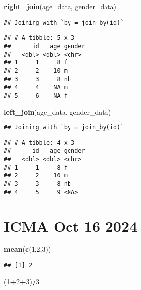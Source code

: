\documentclass[
]{article}
\newenvironment{Shaded}{\begin{snugshade}}{\end{snugshade}}
\newcommand{\DecValTok}[1]{\textcolor[rgb]{0.00,0.00,0.81}{#1}}
\newcommand{\FunctionTok}[1]{\textcolor[rgb]{0.13,0.29,0.53}{\textbf{#1}}}
\newcommand{\NormalTok}[1]{#1}
\newcommand{\SpecialCharTok}[1]{\textcolor[rgb]{0.81,0.36,0.00}{\textbf{#1}}}
\begin{document}
\begin{Shaded}
\begin{Highlighting}[]
\FunctionTok{right\_join}\NormalTok{(age\_data, gender\_data)}
\end{Highlighting}
\end{Shaded}

\begin{verbatim}
## Joining with `by = join_by(id)`
\end{verbatim}

\begin{verbatim}
## # A tibble: 5 x 3
##      id   age gender
##   <dbl> <dbl> <chr> 
## 1     1     8 f     
## 2     2    10 m     
## 3     3     8 nb    
## 4     4    NA m     
## 5     6    NA f
\end{verbatim}

\begin{Shaded}
\begin{Highlighting}[]
\FunctionTok{left\_join}\NormalTok{(age\_data, gender\_data)}
\end{Highlighting}
\end{Shaded}

\begin{verbatim}
## Joining with `by = join_by(id)`
\end{verbatim}

\begin{verbatim}
## # A tibble: 4 x 3
##      id   age gender
##   <dbl> <dbl> <chr> 
## 1     1     8 f     
## 2     2    10 m     
## 3     3     8 nb    
## 4     5     9 <NA>
\end{verbatim}

\section{ICMA Oct 16 2024}\label{icma-oct-16-2024}

\begin{Shaded}
\begin{Highlighting}[]
\FunctionTok{mean}\NormalTok{(}\FunctionTok{c}\NormalTok{(}\DecValTok{1}\NormalTok{,}\DecValTok{2}\NormalTok{,}\DecValTok{3}\NormalTok{))}
\end{Highlighting}
\end{Shaded}

\begin{verbatim}
## [1] 2
\end{verbatim}

\begin{Shaded}
\begin{Highlighting}[]
\NormalTok{(}\DecValTok{1}\SpecialCharTok{+}\DecValTok{2}\SpecialCharTok{+}\DecValTok{3}\NormalTok{)}\SpecialCharTok{/}\DecValTok{3}
\end{Highlighting}
\end{Shaded}
\end{document}
